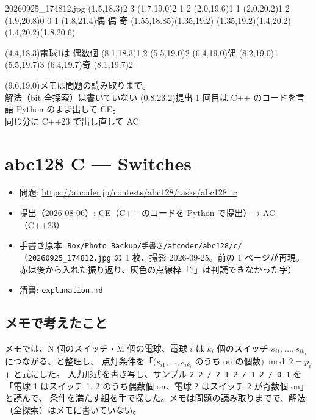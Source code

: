 \documentclass[a4paper]{article}
\begin{document}
\begin{memopage}{20260925\_174812.jpg}
  \hw(1.5,18.3){2 3}
  \hw(1.7,19.0){2 1 2}
  \hw(2.0,19.6){1 1}
  \hw(2.0,20.2){1 2}
  \hw(1.9,20.8){0 0 1}
  \hw(1.8,21.4){偶 偶 奇}
  \hwline(1.55,18.85)(1.35,19.2)
  \hwline(1.35,19.2)(1.4,20.2)
  \hwline(1.4,20.2)(1.8,20.6)

  \hw(4.4,18.3){電球1は 偶数個}
  \hw(8.1,18.3){1,2}
  \hw(5.5,19.0){2}
  \hw(6.4,19.0){偶}
  \hw(8.2,19.0){1}
  \hw(5.5,19.7){3}
  \hw(6.4,19.7){奇}
  \hw(8.1,19.7){2}

  \redpen(9.6,19.0){メモは問題の読み取りまで。\\解法（bit 全探索）は書いていない}
  \redpen(0.8,23.2){提出 1 回目は C++ のコードを言語 Python のまま出して CE。\\同じ分に C++23 で出し直して AC}
\end{memopage}

\clearpage
\section*{abc128 C --- Switches}

\begin{itemize}
  \item 問題: \url{https://atcoder.jp/contests/abc128/tasks/abc128_c}
  \item 提出（2026-08-06）:
    \href{https://atcoder.jp/contests/abc128/submissions/78154478}{CE}（C++ のコードを Python で提出）→
    \href{https://atcoder.jp/contests/abc128/submissions/78154485}{AC}（C++23）
  \item 手書き原本: \texttt{Box/Photo Backup/手書き/atcoder/abc128/c/}（\texttt{20260925\_174812.jpg} の 1 枚、撮影 2026-09-25。前の 1 ページが再現。赤は後から入れた振り返り、灰色の点線枠「?」は判読できなかった字）
  \item 清書: \texttt{explanation.md}
\end{itemize}

\subsection*{メモで考えたこと}
メモでは、N 個のスイッチ・M 個の電球、電球 $i$ は $k_i$ 個のスイッチ $s_{i1}, \dots, s_{ik_i}$ につながる、と整理し、
点灯条件を「$(s_{i1}, \dots, s_{ik_i}$ のうち on の個数$) \bmod 2 = p_i$」と式にした。
入力形式を書き写し、サンプル \verb|2 2 / 2 1 2 / 1 2 / 0 1| を「電球 1 はスイッチ 1, 2 のうち偶数個 on、電球 2 はスイッチ 2 が奇数個 on」と読んで、
条件を満たす組を手で探した。メモは問題の読み取りまでで、解法（全探索）はメモに書いていない。
\end{document}
